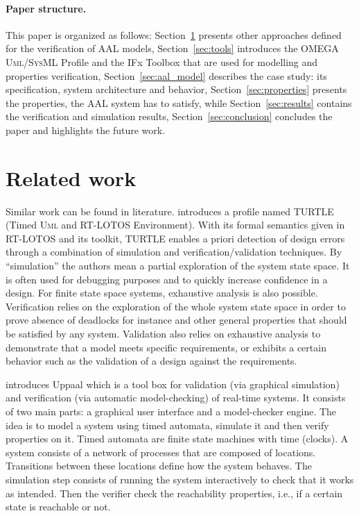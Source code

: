 \documentclass[a4paper,twoside]{article}
\def\UML{\textsc{Uml}}
\def\SysML{\textsc{SysML}}
\begin{document}
\paragraph*{Paper structure.} This paper is organized as follows: Section~\ref{sec:r_work} presents other approaches defined for the verification of AAL models, Section~\ref{sec:tools} introduces the OMEGA \UML{}/\SysML{} Profile and the IFx Toolbox that are used for modelling and properties verification, Section~\ref{sec:aal_model} describes the case study: its specification, system architecture and behavior, Section~\ref{sec:properties} presents the properties, the AAL system has to satisfy, while Section~\ref{sec:results} contains the verification and simulation results, Section~\ref{sec:conclusion} concludes the paper and highlights the future work.

\section{Related work}
\label{sec:r_work}

Similar work can be found in literature. \cite{test9} introduces a profile named TURTLE (Timed \UML{} and RT-LOTOS Environment). With its formal semantics given in RT-LOTOS and its toolkit, TURTLE enables a priori detection of design errors through a combination of simulation and verification/validation techniques. By “simulation” the authors mean a partial exploration of the system state space. It is often used for debugging purposes and to quickly increase confidence in a design. For finite state space systems, exhaustive analysis is also possible. Verification relies 
on the exploration of the whole system state space in order to prove absence of deadlocks for instance and other general properties that should be satisfied by any system. Validation also relies on exhaustive analysis to demonstrate that a model meets specific requirements, or exhibits a certain behavior  such as the validation of a design against the requirements.

\cite{test10} introduces Uppaal which is a tool box for validation (via graphical simulation) and verification (via automatic model-checking) of real-time systems. It consists of two main parts: a graphical user interface and a model-checker engine. The idea is to model a system using timed automata, simulate it and then verify properties on it. Timed automata are finite state machines with time (clocks). A system consists of a network of processes that are composed of locations. Transitions between these locations define how the system behaves. The simulation step consists of running the system interactively to check that it works as intended. Then the verifier check the reachability properties, i.e., if a certain state is reachable or not. 
\end{document}
